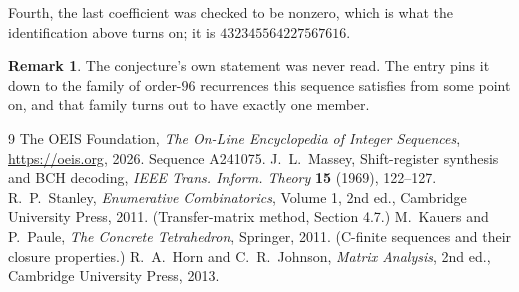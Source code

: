 \documentclass[11pt,a4paper]{article}
\theoremstyle{plain}
\theoremstyle{definition}
\newtheorem{remark}[theorem]{Remark}
\begin{document}
Fourth, the last coefficient was checked to be nonzero, which is what the identification above
turns on; it is $432345564227567616$.

\begin{remark}
The conjecture's own statement was never read. The entry pins it down to the family of
order-$96$ recurrences this sequence satisfies from some point on, and that family turns
out to have exactly one member.
\end{remark}

\begin{thebibliography}{9}
 The OEIS Foundation, \emph{The On-Line Encyclopedia of Integer
Sequences}, \url{https://oeis.org}, 2026. Sequence A241075.
 J.~L.~Massey, Shift-register synthesis and BCH decoding, \emph{IEEE
Trans. Inform. Theory} \textbf{15} (1969), 122--127.
 R.~P.~Stanley, \emph{Enumerative Combinatorics}, Volume 1, 2nd ed.,
Cambridge University Press, 2011. (Transfer-matrix method, Section 4.7.)
 M.~Kauers and P.~Paule, \emph{The Concrete Tetrahedron}, Springer, 2011.
(C-finite sequences and their closure properties.)
 R.~A.~Horn and C.~R.~Johnson, \emph{Matrix Analysis}, 2nd ed., Cambridge
University Press, 2013.
\end{thebibliography}
\end{document}
